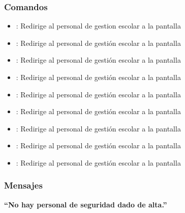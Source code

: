 \subsubsection{Comandos}
\begin{itemize}
    \item {}: Redirige al personal de gestion escolar a la pantalla 
    
    \item {}: Redirige al personal de gestión escolar a la pantalla 
    \item {}: Redirige al personal de gestión escolar a la pantalla 
    
    \item {}: Redirige al personal de gestión escolar a la pantalla 
    \item {}: Redirige al personal de gestión escolar a la pantalla 
    
    \item {}: Redirige al personal de gestión escolar a la pantalla 
    \item {}: Redirige al personal de gestión escolar a la pantalla 
    
    \item {}: Redirige al personal de gestión escolar a la pantalla 
    \item {}: Redirige al personal de gestión escolar a la pantalla     
\end{itemize}

\subsubsection{Mensajes}

\begin{Citemize}
    \item {\bf  ``No hay personal de seguridad dado de alta.''}
\end{Citemize}


